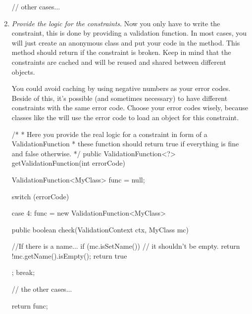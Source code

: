 \begin{enumerate}
\begin{example}[style=java, title={Select error codes}]
{{    // other cases...
    
    }
  }
\end{example}

\item \emph{Provide the logic for the constraints}.  Now you only have to
  write the constraint, this is done by providing a validation function. In
  most cases, you will just create an anonymous class and put your code in
  the  method. This method should return  if the
  constraint is broken. Keep in mind that the constraints are cached and will
  be reused and shared between different  objects.

  You could avoid caching by using negative numbers as your error codes.
  Beside of this, it's possible (and sometimes necessary) to have different
  constraints with the same error code. Choose your error codes wisely,
  because classes like the  will use the error
  code to load an  object for this constraint.

\begin{example}[style=java, title={Select error codes}]
  /*
   * Here you provide the real logic for a constraint in form of a ValidationFunction
   * these function should return true if everything is fine and false otherwise.
   */
  public ValidationFunction<?> getValidationFunction(int errorCode) {
  	ValidationFunction<MyClass> func = null;
  	
  	switch (errorCode){
  	case 4:
  		func  = new ValidationFunction<MyClass> {
  		
  			public boolean check(ValidationContext ctx, MyClass mc){
  			
  				//If there is a name...
  				if (mc.isSetName())
  				{
  					// it shouldn't be empty.
  					return !mc.getName().isEmpty();
  				}
  				return true
  			}
  		};
  		break;
  		
  	// the other cases...
  	
  	}
  	
    return func;
  }
\end{example}

\end{enumerate}